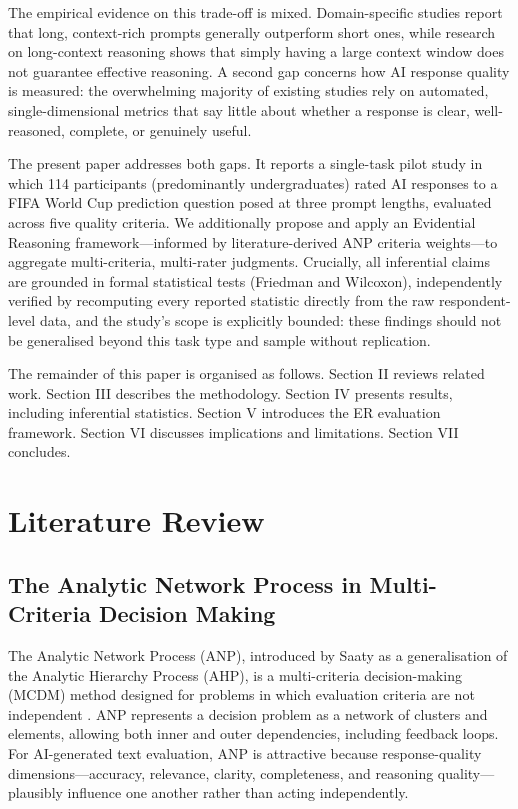\documentclass[conference]{IEEEtran}
\begin{document}
The empirical evidence on this trade-off is mixed. Domain-specific studies report that long, context-rich prompts generally outperform short ones, while research on long-context reasoning shows that simply having a large context window does not guarantee effective reasoning. A second gap concerns how AI response quality is measured: the overwhelming majority of existing studies rely on automated, single-dimensional metrics that say little about whether a response is clear, well-reasoned, complete, or genuinely useful.

The present paper addresses both gaps. It reports a single-task pilot study in which 114 participants (predominantly undergraduates) rated AI responses to a FIFA World Cup prediction question posed at three prompt lengths, evaluated across five quality criteria. We additionally propose and apply an Evidential Reasoning framework---informed by literature-derived ANP criteria weights---to aggregate multi-criteria, multi-rater judgments. Crucially, all inferential claims are grounded in formal statistical tests (Friedman and Wilcoxon), independently verified by recomputing every reported statistic directly from the raw respondent-level data, and the study's scope is explicitly bounded: these findings should not be generalised beyond this task type and sample without replication.

The remainder of this paper is organised as follows. Section II reviews related work. Section III describes the methodology. Section IV presents results, including inferential statistics. Section V introduces the ER evaluation framework. Section VI discusses implications and limitations. Section VII concludes.

\section{Literature Review}

\subsection{The Analytic Network Process in Multi-Criteria Decision Making}
The Analytic Network Process (ANP), introduced by Saaty as a generalisation of the Analytic Hierarchy Process (AHP), is a multi-criteria decision-making (MCDM) method designed for problems in which evaluation criteria are not independent \cite{saaty2001}. ANP represents a decision problem as a network of clusters and elements, allowing both inner and outer dependencies, including feedback loops. For AI-generated text evaluation, ANP is attractive because response-quality dimensions---accuracy, relevance, clarity, completeness, and reasoning quality---plausibly influence one another rather than acting independently.
\end{document}
